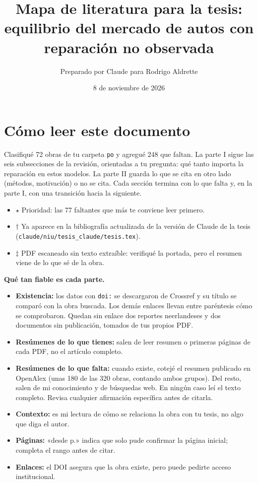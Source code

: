 \documentclass[11pt]{article}
\title{Mapa de literatura para la tesis:\\ equilibrio del mercado de autos con reparación no observada}
\author{Preparado por Claude para Rodrigo Aldrette}
\date{8 de noviembre de 2026}
\begin{document}
\maketitle

\section*{Cómo leer este documento}
Clasifiqué 72 obras de tu carpeta \texttt{po} y agregué 248 que faltan. La parte I sigue las seis subsecciones de la revisión, orientadas a tu pregunta: qué tanto importa la reparación en estos modelos. La parte II guarda lo que se cita en otro lado (métodos, motivación) o no se cita. Cada sección termina con lo que falta y, en la parte I, con una transición hacia la siguiente.

\begin{itemize}
\item $\star$ Prioridad: las 77 faltantes que más te conviene leer primero.
\item $\dagger$ Ya aparece en la bibliografía actualizada de la versión de Claude de la tesis (\texttt{claude/niu/tesis\_claude/tesis.tex}).
\item $\ddagger$ PDF escaneado sin texto extraíble: verifiqué la portada, pero el resumen viene de lo que sé de la obra.
\end{itemize}

\textbf{Qué tan fiable es cada parte.}
\begin{itemize}
\item \textbf{Existencia:} los datos con \texttt{doi:} se descargaron de Crossref y su título se comparó con la obra buscada. Los demás enlaces llevan entre paréntesis cómo se comprobaron. Quedan sin enlace dos reportes neerlandeses y dos documentos sin publicación, tomados de tus propios PDF.
\item \textbf{Resúmenes de lo que tienes:} salen de leer resumen o primeras páginas de cada PDF, no el artículo completo.
\item \textbf{Resúmenes de lo que falta:} cuando existe, cotejé el resumen publicado en OpenAlex (unas 180 de las 320 obras, contando ambos grupos). Del resto, salen de mi conocimiento y de búsquedas web. En ningún caso leí el texto completo. Revisa cualquier afirmación específica antes de citarla.
\item \textbf{Contexto:} es mi lectura de cómo se relaciona la obra con tu tesis, no algo que diga el autor.
\item \textbf{Páginas:} «desde p.» indica que solo pude confirmar la página inicial; completa el rango antes de citar.
\item \textbf{Enlaces:} el DOI asegura que la obra existe, pero puede pedirte acceso institucional.
\end{itemize}
\tableofcontents
\clearpage
\end{document}

